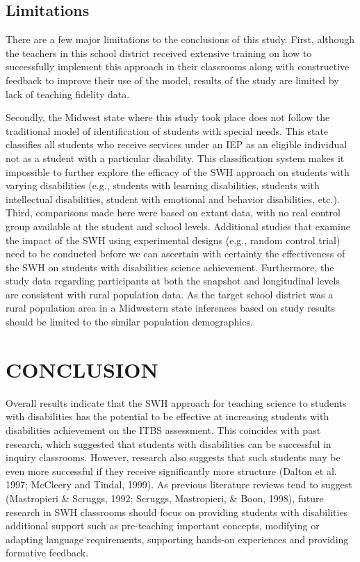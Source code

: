 \documentclass[11.5pt]{sig-alternate} %
\begin{document}
\begin{large}
\subsection*{Limitations}
There are a few major limitations to the conclusions of this study. First, although the teachers in this school district received extensive training on how to successfully implement this approach in their classrooms along with constructive feedback to improve their use of the model, results of the study are limited by lack of teaching fidelity data.

Secondly, the Midwest state where this study took place does not follow the traditional model of identification of students with special needs. This state classifies all students who receive services under an IEP as an eligible individual not as a student with a particular disability. This classification system makes it impossible to further explore the efficacy of the SWH approach on students with varying disabilities (e.g., students with learning disabilities, students with intellectual disabilities, student with emotional and behavior disabilities, etc.). Third, comparisons made here were based on extant data, with no real control group available at the student and school levels. Additional studies that examine the impact of the SWH using experimental designs (e.g., random control trial) need to be conducted before we can ascertain with certainty the effectiveness of the SWH on students with disabilities science achievement. Furthermore, the study data regarding participants at both the snapshot and longitudinal levels are consistent with rural population data. As the target school district was a rural population area in a Midwestern state inferences based on study results should be limited to the similar population demographics.

\section*{CONCLUSION}
Overall results indicate that the SWH approach for teaching science to students with disabilities has the potential to be effective at increasing students with disabilities achievement on the ITBS assessment. This coincides with past research, which suggested that students with disabilities can be successful in inquiry classrooms. However, research also suggests that such students may be even more successful if they receive significantly more structure (Dalton et al. 1997; McCleery and Tindal, 1999). As previous literature reviews tend to suggest (Mastropieri \& Scruggs, 1992; Scruggs, Mastropieri, \& Boon, 1998), future research in SWH classrooms should focus on providing students with disabilities additional support such as pre-teaching important concepts, modifying or adapting language requirements, supporting hands-on experiences and providing formative feedback.


\end{large}
\end{document}
